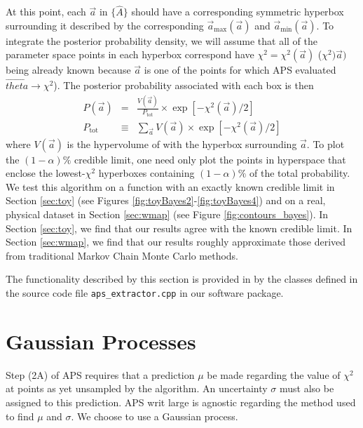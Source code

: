 \documentclass[useAMS,usenatbib]{aastex}
\newcommand{\APS}{APS }
\begin{document}
At this point, each $\vec{a}$ in $\{\hat{A}\}$ should have a corresponding symmetric hyperbox
surrounding it described by the corresponding 
$\vec{a}_\text{max}(\vec{a})$ and $\vec{a}_\text{min}(\vec{a})$.  
To integrate the posterior probability density, we will assume that all of the
parameter space points in each hyperbox correspond have $\chi^2=\chi^2(\vec{a})$
($\chi^2)\vec{a})$ being already known because $\vec{a}$ is one of the points for which APS evaluated
$\vec{theta}\rightarrow\chi^2$).
The posterior probability associated with each box is then
\begin{eqnarray}
P(\vec{a})&=&\frac{V(\vec{a})}{P_\text{tot}}\times\exp\left[-\chi^2(\vec{a})/2\right]
\label{eqn:posterior}\\
P_\text{tot}&\equiv&\sum_{\vec{a}} V(\vec{a})\times\exp\left[-\chi^2(\vec{a})/2\right]
\end{eqnarray}
where $V(\vec{a})$ is the hypervolume of with the hyperbox surrounding $\vec{a}$.
To plot the $(1-\alpha)\%$ credible limit, one need only plot the points in hyperspace that
enclose the lowest-$\chi^2$ hyperboxes containing $(1-\alpha)\%$ of the total probability.
We test this algorithm on a function with an exactly known credible limit
in Section \ref{sec:toy} (see Figures \ref{fig:toyBayes2}-\ref{fig:toyBayes4}) 
and on a real, physical dataset in Section \ref{sec:wmap} (see Figure \ref{fig:contours_bayes}).  
In  Section \ref{sec:toy}, we find that our results agree with the known credible limit.
In Section \ref{sec:wmap}, we find that our results roughly approximate those derived from traditional
Markov Chain Monte Carlo methods.

The functionality described by this section is provided in by the classes defined in the source
code file \verb|aps_extractor.cpp| in our software package.

\section{Gaussian Processes}
\label{sec:gp}

Step (2A) of \APS requires that a prediction $\mu$ be made regarding the value
of $\chi^2$ at points as yet unsampled by the algorithm.  An uncertainty $\sigma$
must also be assigned to this prediction.  APS writ large is agnostic regarding
the method used to find $\mu$ and $\sigma$.  We choose to use a Gaussian process.
\end{document}
